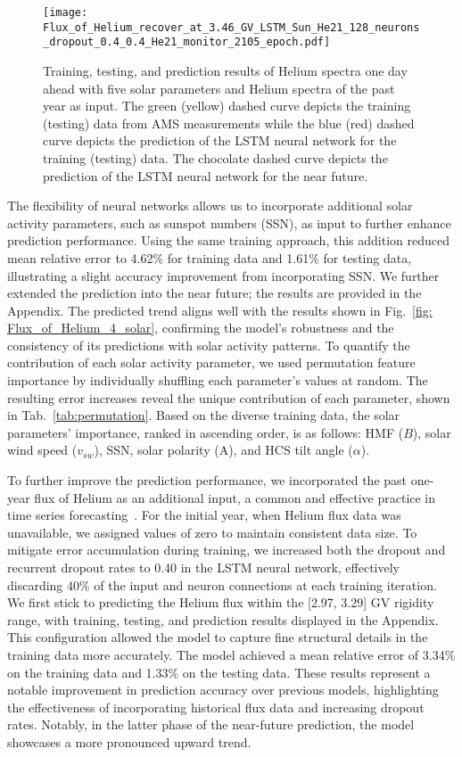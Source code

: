 \documentclass[twocolumn,,12pt]{aastex631}
\begin{document}
\begin{figure*}[tbh!]
\centering
\texttt{[image: Flux\_of\_Helium\_recover\_at\_3.46\_GV\_LSTM\_Sun\_He21\_128\_neurons\_dropout\_0.4\_0.4\_He21\_monitor\_2105\_epoch.pdf]}
\caption{Training, testing, and prediction results of Helium spectra one day ahead with five solar parameters and Helium spectra of the past year as input. The green (yellow) dashed curve depicts the training (testing) data from AMS measurements while the blue (red) dashed curve depicts the prediction of the LSTM neural network for the training (testing) data. The chocolate dashed curve depicts the prediction of the LSTM neural network for the near future.}
\label{fig: Spectra_of_Helium_5_solar_He} 
\end{figure*}

The flexibility of neural networks allows us to incorporate additional solar activity parameters, such as sunspot numbers (SSN), as input to further enhance prediction performance. Using the same training approach, this addition reduced mean relative error to 4.62\% for training data and 1.61\% for testing data, illustrating a slight accuracy improvement from incorporating SSN. We further extended the prediction into the near future; the results are provided in the Appendix. The predicted trend aligns well with the results shown in Fig.~\ref{fig: Flux_of_Helium_4_solar}, confirming the model's robustness and the consistency of its predictions with solar activity patterns.
To quantify the contribution of each solar activity parameter, we used permutation feature importance by individually shuffling each parameter's values at random. The resulting error increases reveal the unique contribution of each parameter, shown in Tab.~\ref{tab:permutation}. Based on the diverse training data, the solar parameters' importance, ranked in ascending order, is as follows: HMF ($B$), solar wind speed ($v_{sw}$), SSN, solar polarity (A), and HCS tilt angle ($\alpha$). 

To further improve the prediction performance, we incorporated the past one-year flux of Helium as an additional input, a common and effective practice in time series forecasting~\cite{lam2023learning}. For the initial year, when Helium flux data was unavailable, we assigned values of zero to maintain consistent data size. To mitigate error accumulation during training, we increased both the dropout and recurrent dropout rates to 0.40 in the LSTM neural network, effectively discarding 40\% of the input and neuron connections at each training iteration.
We first stick to predicting the Helium flux within the [2.97, 3.29] GV rigidity range, with training, testing, and prediction results displayed in the Appendix. This configuration allowed the model to capture fine structural details in the training data more accurately. The model achieved a mean relative error of 3.34\% on the training data and 1.33\% on the testing data. These results represent a notable improvement in prediction accuracy over previous models, highlighting the effectiveness of incorporating historical flux data and increasing dropout rates. Notably, in the latter phase of the near-future prediction, the model showcases a more pronounced upward trend.
\end{document}

